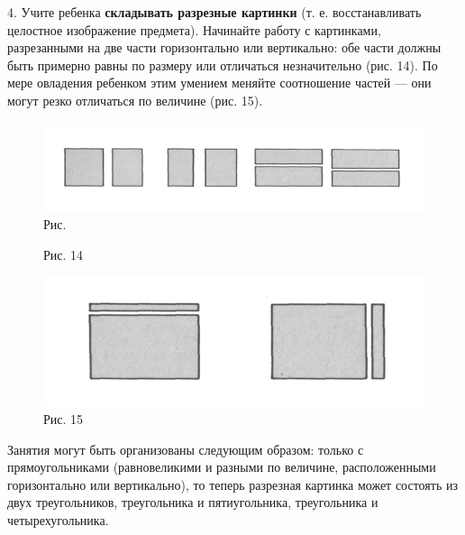 \documentclass[a5paper]{book}
\begin{document}
4. Учите ребенка \textbf{складывать разрезные картинки} (т. е.
восстанавливать целостное изображение предмета). Начинайте работу с
картинками, разрезанными на две части горизонтально или вертикально: обе
части должны быть примерно равны по размеру или отличаться незначительно
(рис. 14). По мере овладения ребенком этим умением меняйте соотношение
частей --- они могут резко отличаться по величине (рис. 15).

\begin{figure}
\centering
\includegraphics[width=\linewidth]{media/media/image14.png} Рис.
\caption*{Рис. 14}
\end{figure}

\begin{figure}
\centering
\includegraphics[width=\linewidth]{media/media/image15.png}
\caption*{Рис. 15}
\end{figure}

Занятия могут быть организованы следующим образом: только с
прямоугольниками (равновеликими и разными по величине, расположенными
горизонтально или вертикально), то теперь разрезная картинка может
состоять из двух треугольников, треугольника и пятиугольника,
треугольника и четырехугольника.
\end{document}
